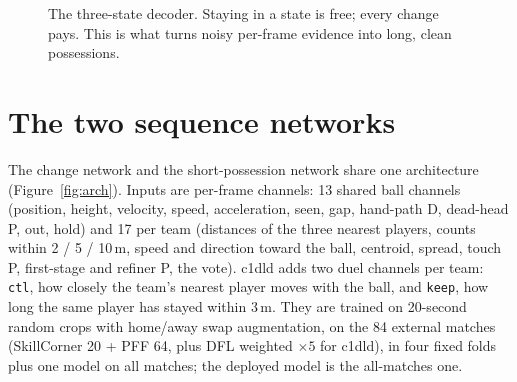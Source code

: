 \documentclass[10pt,a4paper]{article}
\newcommand{\code}[1]{\texttt{\small #1}}
\begin{document}
\begin{figure}[!htbp]
\centering
{}
\caption{The three-state decoder. Staying in a state is free; every change pays. This is what turns
noisy per-frame evidence into long, clean possessions.}
\label{fig:hmm}
\end{figure}

\section{The two sequence networks}\label{sec:nets}

The change network and the short-possession network share one architecture (Figure~\ref{fig:arch}).
Inputs are per-frame channels: 13 shared ball channels (position, height, velocity, speed,
acceleration, seen, gap, hand-path D, dead-head P, out, hold) and 17 per team (distances of the
three nearest players, counts within 2 / 5 / 10\,m, speed and direction toward the ball, centroid,
spread, touch P, first-stage and refiner P, the vote). c1dld adds two duel channels per team:
\code{ctl}, how closely the team's nearest player moves with the ball, and \code{keep}, how long the
same player has stayed within 3\,m. They are trained on 20-second random crops with home/away swap
augmentation, on the 84 external matches (SkillCorner 20 + PFF 64, plus DFL weighted $\times5$ for
c1dld), in four fixed folds plus one model on all matches; the deployed model is the
all-matches one.
\end{document}
